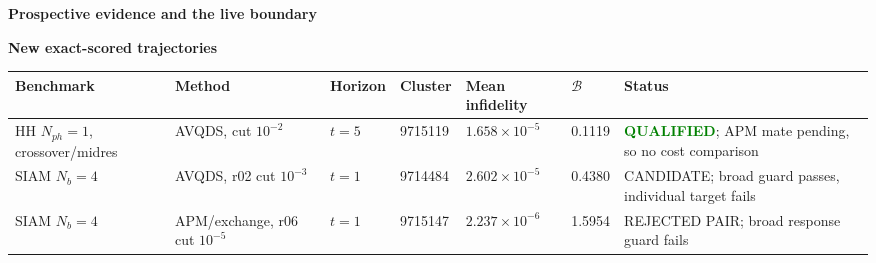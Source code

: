\documentclass[9pt,letterpaper,landscape]{article}
\newcommand{\good}[1]{\textcolor{green}{\textbf{#1}}}
\begin{document}
\newpage
{\LARGE\bfseries\color{navy} Prospective evidence and the live boundary}

{\large\bfseries\color{navy}New exact-scored trajectories}

\small
{}
\begin{tabularx}{\linewidth}{@{}p{1.72in}p{1.42in}C{0.62in}C{0.76in}C{1.00in}C{0.64in}Y@{}}
\toprule
Benchmark & Method & Horizon & Cluster & Mean infidelity & \(\mathcal B\) & Status \\
\midrule
HH \(N_{ph}=1\), crossover/midres & AVQDS, cut \(10^{-2}\) & \(t=5\) & 9715119 & \(1.658\times10^{-5}\) & 0.1119 & \good{QUALIFIED}; APM mate pending, so no cost comparison \\
SIAM \(N_b=4\) & AVQDS, r02 cut \(10^{-3}\) & \(t=1\) & 9714484 & \(2.602\times10^{-5}\) & 0.4380 & CANDIDATE; broad guard passes, individual target fails \\
SIAM \(N_b=4\) & APM/exchange, r06 cut \(10^{-5}\) & \(t=1\) & 9715147 & \(2.237\times10^{-6}\) & 1.5954 & REJECTED PAIR; broad response guard fails \\
\bottomrule
\end{tabularx}
\normalsize
\end{document}
